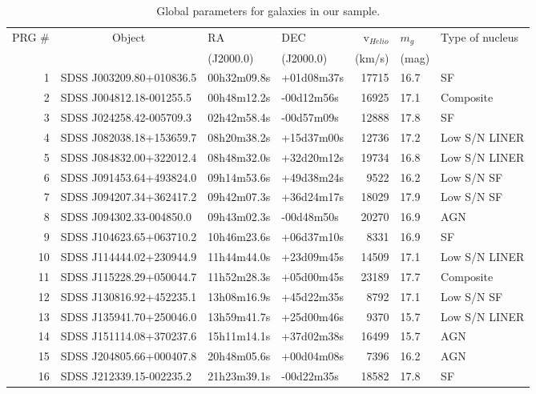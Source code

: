 \documentclass[useAMS,usenatbib]{mn2e}
\begin{document}
\begin{table}
 \centering
  \caption{Global parameters for galaxies in our sample.
  \label{t:Obs}}
\begin{tabular}{rlllrll}
\hline
PRG \# &  \multicolumn{1}{c}{Object}     & RA       & DEC    & v$_{Helio}$  & $m_g$ & Type of nucleus \\
{}     & {}       & (J2000.0)& (J2000.0) & (km/s)     &   (mag)     \\
\hline
{1} & SDSS J003209.80+010836.5 & 00h32m09.8s  & +01d08m37s &   17715  & 16.7 & SF\\
{2} & SDSS J004812.18-001255.5 & 00h48m12.2s  & -00d12m56s &   16925  & 17.1 & Composite\\
{3} & SDSS J024258.42-005709.3 & 02h42m58.4s  & -00d57m09s &   12888  & 17.8 & SF \\
{4} & {SDSS J082038.18+153659.7} & {08h20m38.2s}  & {+15d37m00s} & 12736 &   {17.2} & Low S/N LINER \\
{5} & {SDSS J084832.00+322012.4} & {08h48m32.0s}  & {+32d20m12s} & 19734 & {16.8} & Low S/N LINER \\
{6} & {SDSS J091453.64+493824.0} & {09h14m53.6s}  & {+49d38m24s}  & 9522 & {16.2} & Low S/N SF \\
{7} & {SDSS J094207.34+362417.2} & {09h42m07.3s}  & {+36d24m17s}  & 18029 & {17.9} & Low S/N SF\\
{8} & {SDSS J094302.33-004850.0} & {09h43m02.3s}  & {-00d48m50s}  & 20270 & {16.9} & AGN \\
{9} & {SDSS J104623.65+063710.2} & {10h46m23.6s}  & {+06d37m10s}  & 8331 & {16.9}  & SF \\
{10} & {SDSS J114444.02+230944.9} & {11h44m44.0s}  & {+23d09m45s}  & 14509 & {17.1} & Low S/N LINER \\
{11}& {SDSS J115228.29+050044.7} & {11h52m28.3s}  & {+05d00m45s}  & 23189 & {17.7} & Composite\\
{12}&{SDSS J130816.92+452235.1} & {13h08m16.9s}  & {+45d22m35s}  & 8792 & {17.1} & Low S/N SF \\
{13}&{SDSS J135941.70+250046.0} & {13h59m41.7s}  & {+25d00m46s}  & 9370 & {15.7} & Low S/N LINER \\
{14}&{SDSS J151114.08+370237.6} & {15h11m14.1s}  & {+37d02m38s}  & 16499 & {15.7} & AGN \\
{15}& SDSS J204805.66+000407.8  & 20h48m05.6s & +00d04m08s   &   7396 & 16.2 & AGN\\
{16}& SDSS J212339.15-002235.2 & 21h23m39.1s & -00d22m35s & 18582 & 17.8 & SF \\
\hline
\end{tabular}
\end{table}
\end{document}
